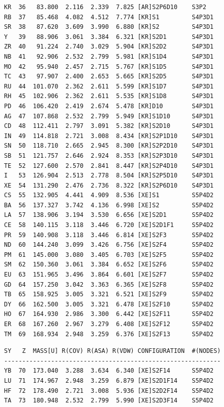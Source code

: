 \documentclass[final,12pt,makeidx,DIV=calc]{article}
\begin{document}
{{{{{{\begin{verbatim}
KR  36   83.800  2.116  2.339  7.825 [AR]S2P6D10    S3P2      
RB  37   85.468  4.082  4.512  7.774 [KR]S1         S4P3D1    
SR  38   87.620  3.609  3.990  6.880 [KR]S2         S4P3D1    
Y   39   88.906  3.061  3.384  6.321 [KR]S2D1       S4P3D1    
ZR  40   91.224  2.740  3.029  5.904 [KR]S2D2       S4P3D1    
NB  41   92.906  2.532  2.799  5.981 [KR]S1D4       S4P3D1    
MO  42   95.940  2.457  2.715  5.767 [KR]S1D5       S4P3D1    
TC  43   97.907  2.400  2.653  5.665 [KR]S2D5       S4P3D1    
RU  44  101.070  2.362  2.611  5.599 [KR]S1D7       S4P3D1    
RH  45  102.906  2.362  2.611  5.535 [KR]S1D8       S4P3D1    
PD  46  106.420  2.419  2.674  5.478 [KR]D10        S4P3D1    
AG  47  107.868  2.532  2.799  5.949 [KR]S1D10      S4P3D1    
CD  48  112.411  2.797  3.091  5.382 [KR]S2D10      S4P3D1    
IN  49  114.818  2.721  3.008  8.434 [KR]S2P1D10    S4P3D1    
SN  50  118.710  2.665  2.945  8.300 [KR]S2P2D10    S4P3D1    
SB  51  121.757  2.646  2.924  8.353 [KR]S2P3D10    S4P3D1    
TE  52  127.600  2.570  2.841  8.447 [KR]S2P4D10    S4P3D1    
I   53  126.904  2.513  2.778  8.504 [KR]S2P5D10    S4P3D1    
XE  54  131.290  2.476  2.736  8.322 [KR]S2P6D10    S4P3D1    
CS  55  132.905  4.441  4.909  8.536 [XE]S1         S5P4D2    
BA  56  137.327  3.742  4.136  6.998 [XE]S2         S5P4D2    
LA  57  138.906  3.194  3.530  6.656 [XE]S2D1       S5P4D2    
CE  58  140.115  3.118  3.446  6.720 [XE]S2D1F1     S5P4D2    
PR  59  140.908  3.118  3.446  6.814 [XE]S2F3       S5P4D2    
ND  60  144.240  3.099  3.426  6.756 [XE]S2F4       S5P4D2    
PM  61  145.000  3.080  3.405  6.703 [XE]S2F5       S5P4D2    
SM  62  150.360  3.061  3.384  6.652 [XE]S2F6       S5P4D2    
EU  63  151.965  3.496  3.864  6.601 [XE]S2F7       S5P4D2    
GD  64  157.250  3.042  3.363  6.365 [XE]S2F8       S5P4D2    
TB  65  158.925  3.005  3.321  6.521 [XE]S2F9       S5P4D2    
DY  66  162.500  3.005  3.321  6.478 [XE]S2F10      S5P4D2    
HO  67  164.930  2.986  3.300  6.442 [XE]S2F11      S5P4D2    
ER  68  167.260  2.967  3.279  6.408 [XE]S2F12      S5P4D2    
TM  69  168.934  2.948  3.259  6.376 [XE]S2F13      S5P4D2    
\end{verbatim}
\newpage
\begin{verbatim}
SY   Z  MASS[U] R(COV) R(ASA) R(VDW) CONFIGURATION  #(NODES)
------------------------------------------------------------
YB  70  173.040  3.288  3.634  6.340 [XE]S2F14      S5P4D2    
LU  71  174.967  2.948  3.259  6.879 [XE]S2D1F14    S5P4D2    
HF  72  178.490  2.721  3.008  5.936 [XE]S2D2F14    S5P4D2    
TA  73  180.948  2.532  2.799  5.990 [XE]S2D3F14    S5P4D2    

\end{verbatim}}}}}}}
\end{document}
